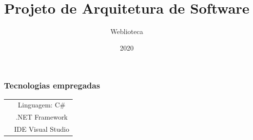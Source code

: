 \documentclass{beamer}
\title{Projeto de Arquitetura de Software}
\author{Weblioteca}
\institute{Universidade Estadual de Maringá}
\date{2020}
\begin{document}
  \frame{\titlepage}

  \begin{frame}
  \frametitle{Tecnologias empregadas}

\begin{tabular}{c|c}
     & Linguagem: C\# \\ 
     & .NET Framework\\ 
     & IDE Visual Studio\\ 
\end{tabular}

  \end{frame}
\end{document}
